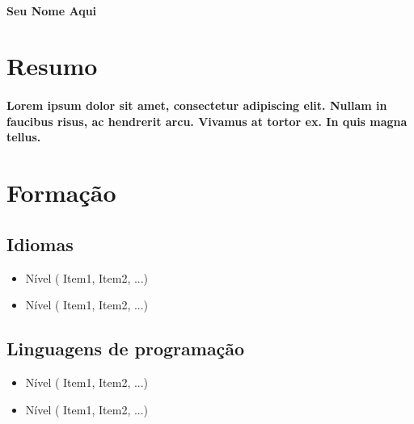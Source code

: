 \documentclass[a4paper,12pt]{memoir} %
\begin{document}

\userinformation 	%

\framebreak 			%

\hfill \\   			%



\textbf{\Large {Seu Nome Aqui}}

\section*{Resumo}

\paragraph
{
	Lorem ipsum dolor sit amet, consectetur adipiscing elit. Nullam in faucibus risus, ac hendrerit arcu. Vivamus at tortor ex. In quis magna tellus.
}



\section*{Formação}

\subsection*{Idiomas}

\begin{itemize}
	\item Nível ( Item1, Item2, ...)
	\item Nível ( Item1, Item2, ...)
\end{itemize}

\subsection*{Linguagens de programação}

\begin{itemize}
	\item Nível ( Item1, Item2, ...)
	\item Nível ( Item1, Item2, ...)
\end{itemize}
\end{document}
